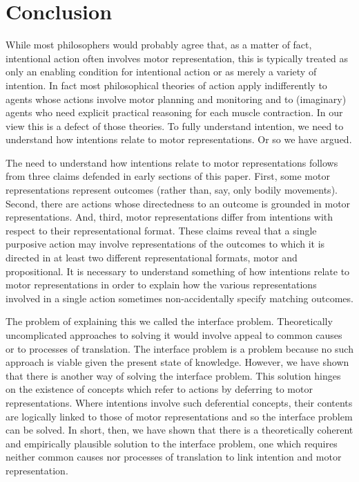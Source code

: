 \documentclass[12pt,\papersize]{extarticle}
\begin{document}
\section{Conclusion}

While most philosophers would probably agree that, as a matter of fact, intentional action often involves motor representation, this is typically treated as only an enabling condition for intentional action or as merely a variety of intention. In fact most philosophical theories of action apply indifferently to agents whose actions involve motor planning and monitoring and to (imaginary) agents who need explicit practical reasoning for each muscle contraction. In our view this is a defect of those theories. To fully understand intention, we need to understand how intentions relate to motor representations.  Or so we have argued.  

The need to understand how intentions relate to motor representations follows from three claims defended in early sections of this paper. First, some motor representations represent outcomes (rather than, say, only bodily movements). Second, there are actions whose directedness to an outcome is grounded in motor representations. And, third, motor representations differ from intentions with respect to their representational format. These claims reveal that a single purposive action may involve representations of the outcomes to which it is directed in at least two different representational formats, motor and propositional. It is necessary to understand something of how intentions relate to motor representations in order to explain how the various representations involved in a single action sometimes non-accidentally specify matching outcomes.

The problem of explaining this we called the interface problem. Theoretically uncomplicated approaches to solving it would involve appeal to common causes or to processes of translation. The interface problem is a problem because no such approach is viable given the present state of knowledge. However, we have shown that there is another way of solving the interface problem. This solution hinges on the existence of concepts which refer to actions by deferring to motor representations. Where intentions involve such deferential concepts, their contents are logically linked to those of motor representations and so the interface problem can be solved. In short, then, we have shown that there is a theoretically coherent and empirically plausible solution to the interface problem, one which requires neither common causes nor processes of translation to link intention and motor representation.
\end{document}
